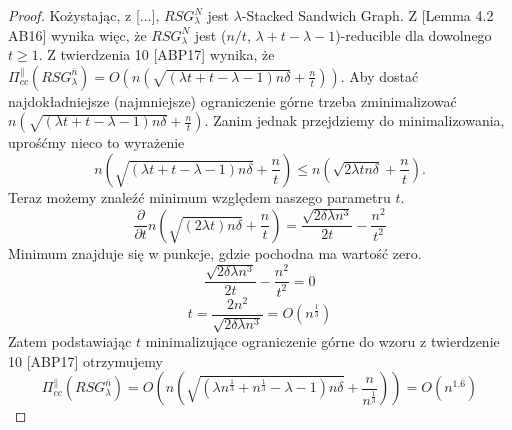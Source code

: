 \begin{proof}
	Kożystając, z [...], $RSG_{\lambda}^{N}$ jest $\lambda$-Stacked Sandwich Graph.
	Z [Lemma 4.2 AB16] wynika więc, że $RSG_{\lambda}^{N}$  jest ($n / t$, $\lambda + t - \lambda - 1$)-reducible dla dowolnego $t \geq 1$.
	Z twierdzenia 10 [ABP17] wynika, że $\Pi_{cc}^{ \parallel }(RSG_{\lambda}^{\overline{n}}) = O \left( n \left( \sqrt{( \lambda t + t - \lambda - 1)n \delta } + \frac{n}{t} \right) \right)$.
	Aby dostać najdokładniejsze (najmniejsze) ograniczenie górne trzeba zminimalizować
	$n \left( \sqrt{( \lambda t + t - \lambda - 1)n \delta } + \frac{n}{t} \right)$.
	Zanim jednak przejdziemy do minimalizowania, uprośćmy nieco to wyrażenie
	$$ n \left( \sqrt{( \lambda t + t - \lambda - 1)n \delta } + \frac{n}{t} \right) \leq n \left( \sqrt{ 2\lambda t n \delta } + \frac{n}{t} \right) .$$
	Teraz możemy znaleźć minimum względem naszego parametru $t$.
	$$ \frac{\partial}{\partial t} n \left( \sqrt{( 2\lambda t)n \delta } + \frac{n}{t} \right) = \frac{ \sqrt{ 2 \delta \lambda n^{3} }}{2t} - \frac{n^{2}}{t^{2}}$$
	Minimum znajduje się w punkcje, gdzie pochodna ma wartość zero.
	$$ \frac{ \sqrt{ 2 \delta \lambda n^{3} }}{2t} - \frac{n^{2}}{t^{2}} = 0$$
	$$ t = \frac{2n^{2}}{ \sqrt{ 2 \delta \lambda n^{3} }} = O \left( n^{\frac{1}{3}} \right) $$
	Zatem podstawiając $t$ minimalizujące ograniczenie górne do wzoru z twierdzenie 10 [ABP17] otrzymujemy
	$$ \Pi_{cc}^{ \parallel }(RSG_{\lambda}^{\overline{n}}) = O \left( n \left( \sqrt{( \lambda n^{\frac{1}{3}} + n^{\frac{1}{3}} - \lambda - 1)n \delta } + \frac{n}{n^{\frac{1}{3}}} \right) \right) = O \left( n^{1.\overline{6}} \right) $$
\end{proof}





